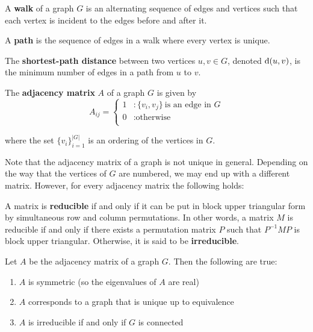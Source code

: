 \begin{definition}
  A \textbf{walk} of a graph $G$ is an alternating sequence of edges and vertices such that each
  vertex is incident to the edges before and after it.

  A \textbf{path} is the sequence of edges in a walk where every vertex is unique.

  The \textbf{shortest-path distance} between two vertices $u,v \in G$, denoted $\mathrm{d}(u,v)$, is the
  minimum number of edges in a path from $u$ to $v$.
\end{definition}

\begin{definition}
  The \textbf{adjacency matrix} $A$ of a graph $G$ is given by
  \[
    A_{ij} = \begin{cases}
      1 &: \{v_i,v_j\} ~\text{is an edge in $G$} \\
      0 &: \text{otherwise} \\
    \end{cases}
  \]

  where the set $\{v_i\}_{i=1}^{|G|}$ is an ordering of the vertices in $G$.
\end{definition}
 

Note that the adjacency matrix of a graph is not unique in general. Depending on
the way that the vertices of $G$ are numbered, we may end up with a different
matrix. However, for every adjacency matrix the following holds:


\begin{definition}
  A matrix is \textbf{reducible} if and only if it can be put in block upper triangular
  form by simultaneous row and column permutations. In other words, a matrix $M$
  is reducible if and only if there exists a permutation matrix $P$ such that
  $P^{-1}MP$ is block upper triangular. Otherwise, it is said to be
  \textbf{irreducible}.
\end{definition}

\begin{proposition}
  Let $A$ be the adjacency matrix of a graph $G$. Then the following are true:

  \begin{enumerate}
  \item $A$ is symmetric (so the eigenvalues of $A$ are real)
  \item $A$ corresponds to a graph that is unique up to equivalence
  \item $A$ is irreducible if and only if $G$ is connected
  \end{enumerate}
\end{proposition}

